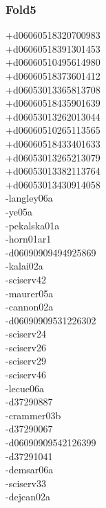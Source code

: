 \begin{multicols}{3}
\subsubsection*{Fold5}
+d06060518320700983\\
+d06060518391301453\\
+d06060510495614980\\
+d06060518373601412\\
+d06053013365813708\\
+d06060518435901639\\
+d06053013262013044\\
+d06060510265113565\\
+d06060518433401633\\
+d06053013265213079\\
+d06053013382113764\\
+d06053013430914058\\
-langley06a\\
-ye05a\\
-pekalska01a\\
-horn01ar1\\
-d06090909494925869\\
-kalai02a\\
-sciserv42\\
-maurer05a\\
-cannon02a\\
-d06090909531226302\\
-sciserv24\\
-sciserv26\\
-sciserv29\\
-sciserv46\\
-lecue06a\\
-d37290887\\
-crammer03b\\
-d37290067\\
-d06090909542126399\\
-d37291041\\
-demsar06a\\
-sciserv33\\
-dejean02a\\

\end{multicols}
